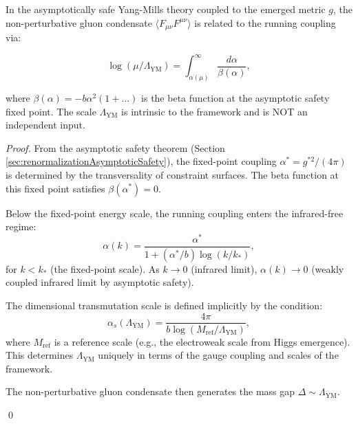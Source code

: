 \begin{lemma}
\label{lem:dimensionalTransmutation}

In the asymptotically safe Yang-Mills theory coupled to the emerged metric $g$, the non-perturbative gluon condensate $\langle F_{\mu\nu} F^{\mu\nu} \rangle$ is related to the running coupling via:

$$\log(\mu/\Lambda_{\mathrm{YM}}) = \int_{\alpha(\mu)}^{\infty} \frac{d\alpha}{\beta(\alpha)},$$

where $\beta(\alpha) = -b \alpha^2 (1 + \ldots)$ is the beta function at the asymptotic safety fixed point. The scale $\Lambda_{\mathrm{YM}}$ is intrinsic to the framework and is NOT an independent input.

\begin{proof}

From the asymptotic safety theorem (Section \ref{sec:renormalizationAsymptoticSafety}), the fixed-point coupling $\alpha^* = g^{*2}/(4\pi)$ is determined by the transversality of constraint surfaces. The beta function at this fixed point satisfies $\beta(\alpha^*) = 0$.

Below the fixed-point energy scale, the running coupling enters the infrared-free regime:
$$\alpha(k) = \frac{\alpha^*}{1 + (\alpha^*/b) \log(k/k_*)},$$
for $k < k_*$ (the fixed-point scale). As $k \to 0$ (infrared limit), $\alpha(k) \to 0$ (weakly coupled infrared limit by asymptotic safety).

The dimensional transmutation scale is defined implicitly by the condition:
$$\alpha_s(\Lambda_{\mathrm{YM}}) = \frac{4\pi}{b \log(M_{\text{ref}}/\Lambda_{\mathrm{YM}})},$$
where $M_{\text{ref}}$ is a reference scale (e.g., the electroweak scale from Higgs emergence). This determines $\Lambda_{\mathrm{YM}}$ uniquely in terms of the gauge coupling and scales of the framework.

The non-perturbative gluon condensate then generates the mass gap $\Delta \sim \Lambda_{\mathrm{YM}}$.

\qed

\end{proof}

\end{lemma}

